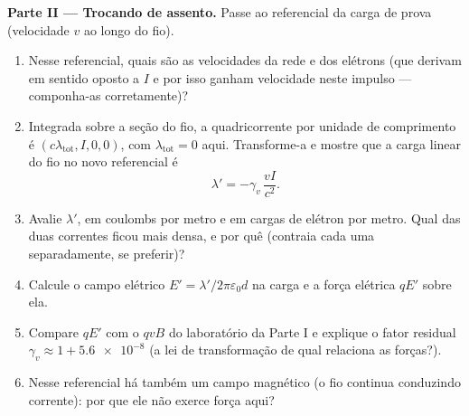 \begin{problem}
\medskip\noindent\textbf{Parte II --- Trocando de assento.}
Passe ao referencial da carga de prova (velocidade $v$ ao longo do fio).
\begin{enumerate}[resume]
  \item Nesse referencial, quais são as velocidades da rede e dos
        elétrons (que derivam em sentido oposto a $I$ e por isso
        ganham velocidade neste impulso --- componha-as corretamente)?
  \item Integrada sobre a seção do fio, a quadricorrente por unidade
        de comprimento é $(c\lambda_{\text{tot}}, I, 0, 0)$, com
        $\lambda_{\text{tot}} = 0$ aqui. Transforme-a e mostre que a
        carga linear do fio no novo referencial é
        \[
        \lambda' = -\gamma_v\,\frac{vI}{c^2} .
        \]
  \item Avalie $\lambda'$, em coulombs por metro e em cargas de
        elétron por metro. Qual das duas correntes ficou mais densa, e
        por quê (contraia cada uma separadamente, se preferir)?
  \item Calcule o campo elétrico $E' = \lambda'/2\pi\varepsilon_0d$ na
        carga e a força elétrica $qE'$ sobre ela.
  \item Compare $qE'$ com o $qvB$ do laboratório da Parte I e explique
        o fator residual $\gamma_v \approx 1 + \num{5.6e-8}$ (a lei de
        transformação de qual  relaciona as forças?).
  \item Nesse referencial há também um campo magnético (o fio continua
        conduzindo corrente): por que ele não exerce força aqui?
\end{enumerate}


\end{problem}
